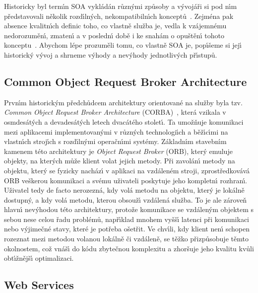 Historicky byl term\'{\i}n \gls{SOA} vykládán různ\'ymi způsoby a v\'yvojáři si
pod n\'{\i}m představovali několik rozd\'{\i}ln\'ych, nekompatibiln\'{\i}ch
konceptů~\cite{fowler2005serviceorientedambiguity}.
Zejména pak absence kvalitn\'{\i}ch definic toho, co vlastně
služba je, vedla k vzájemnému nedorozuměn\'{\i}, zmaten\'{\i} a v posledn\'{\i}
době i ke snahám o opuštěn\'{\i} tohoto konceptu~\cite{cerny2017disambiguation}.
Abychom lépe prozuměli tomu, co vlastně \gls{SOA} je, pop\'{\i}šeme si jej\'{\i} historick\'y
v\'yvoj a shrneme v\'yhody a nev\'yhody jednotliv\'ych př\'{\i}stupů.

\subsection{Common Object Request Broker Architecture}\label{sec:corba}

Prvn\'{\i}m historick\'ym předchůdcem architektury orientované na služby
byla tzv. \textit{Common Object Request Broker Architecture}
(\gls{CORBA})~\cite{siegel2000corba}, která vzikala v osmdesát\'ych a devadesát\'ych letech
dvacátého stolet\'{\i}. Ta umožňuje komunikaci mezi aplikacemi implementovan\'ymi v
různ\'ych technologi\'{\i}ch a běž\'{\i}c\'{\i}mi na vlastn\'{\i}ch stroj\'{\i}ch s rozd\'{\i}ln\'ymi
operačn\'{\i}mi systémy. Základn\'{\i}m stavebn\'{\i}m kamenem této architektury
je \textit{Object Request Broker} (\gls{ORB}), kter\'y emuluje objekty,
na kter\'ych může klient volat jejich metody. Při zavolán\'{\i} metody
na objektu, kter\'y se fyzicky nacház\'{\i} v aplikaci na vzdáleném stroji,
zprostředkovává \gls{ORB} veškerou komunikaci a svému uživateli poskytuje
jeho kompletn\'{\i} rozhran\'{\i}. Uživatel tedy de facto nerozezná, kdy volá
metodu na objektu, kter\'y je lokálně dostupn\'y,
a kdy volá metodu, kterou obsouž\'{\i} vzdálená služba. To je ale zároveň
hlavn\'{\i} nev\'yhodou této architektury, protože komunikace se vzdálen\'ym
objektem s sebou nese celou řadu problémů, např\'{\i}klad mnohem vyšš\'{\i} latenci
při komunikaci nebo v\'yjimečné stavy, které je potřeba ošetřit. Ve chv\'{\i}li,
kdy klient nen\'{\i} schopen rozeznat mezi metodou volanou lokálně či vzdáleně,
se těžko přizpůsobuje těmto okolnostem, což vnáš\'{\i} do kódu zbytečnou
komplexitu a zhoršuje jeho kvalitu kvůli obt\'{\i}žnějš\'{\i} optimalizaci.

\subsection{Web Services}

